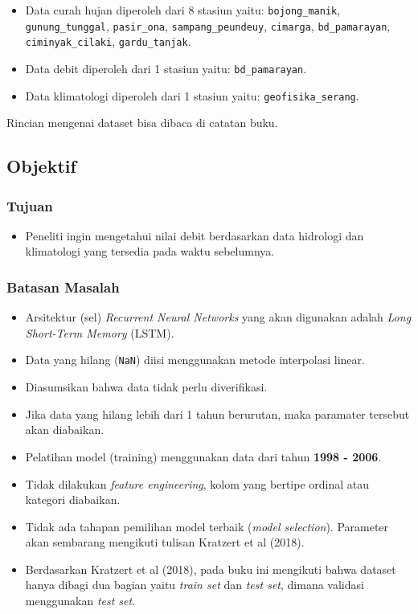 \documentclass[11pt]{article}
\providecommand{\tightlist}{%
      \setlength{\itemsep}{0pt}\setlength{\parskip}{0pt}}
\begin{document}
\begin{itemize}
\tightlist
\item
  Data curah hujan diperoleh dari 8 stasiun yaitu:
  \texttt{bojong\_manik}, \texttt{gunung\_tunggal}, \texttt{pasir\_ona},
  \texttt{sampang\_peundeuy}, \texttt{cimarga}, \texttt{bd\_pamarayan},
  \texttt{ciminyak\_cilaki}, \texttt{gardu\_tanjak}.
\item
  Data debit diperoleh dari 1 stasiun yaitu: \texttt{bd\_pamarayan}.
\item
  Data klimatologi diperoleh dari 1 stasiun yaitu:
  \texttt{geofisika\_serang}.
\end{itemize}

Rincian mengenai dataset bisa dibaca di catatan buku.

    \hypertarget{objektif}{%
\subsection{Objektif}\label{objektif}}

\hypertarget{tujuan}{%
\subsubsection{Tujuan}\label{tujuan}}

\begin{itemize}
\tightlist
\item
  Peneliti ingin mengetahui nilai debit berdasarkan data hidrologi dan
  klimatologi yang tersedia pada waktu sebelumnya.
\end{itemize}

\hypertarget{batasan-masalah}{%
\subsubsection{Batasan Masalah}\label{batasan-masalah}}

\begin{itemize}
\tightlist
\item
  Arsitektur (sel) \emph{Recurrent Neural Networks} yang akan digunakan
  adalah \emph{Long Short-Term Memory} (LSTM).
\item
  Data yang hilang (\texttt{NaN}) diisi menggunakan metode interpolasi
  linear.
\item
  Diasumsikan bahwa data tidak perlu diverifikasi.
\item
  Jika data yang hilang lebih dari 1 tahun berurutan, maka paramater
  tersebut akan diabaikan.
\item
  Pelatihan model (training) menggunakan data dari tahun \textbf{1998 -
  2006}.
\item
  Tidak dilakukan \emph{feature engineering}, kolom yang bertipe ordinal
  atau kategori diabaikan.
\item
  Tidak ada tahapan pemilihan model terbaik (\emph{model selection}).
  Parameter akan sembarang mengikuti tulisan Kratzert et al (2018).
\item
  Berdasarkan Kratzert et al (2018), pada buku ini mengikuti bahwa
  dataset hanya dibagi dua bagian yaitu \emph{train set} dan \emph{test
  set}, dimana validasi menggunakan \emph{test set}.
\end{itemize}
\end{document}
